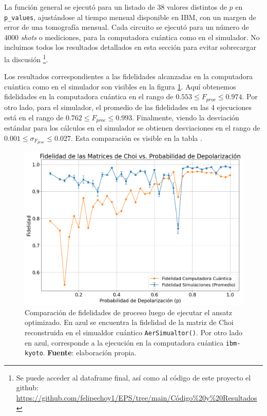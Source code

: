 \documentclass[letterpaper,12pt]{thesisECFM}
\theoremstyle{plain}
\theoremstyle{definition}
\theoremstyle{remark}
\newcommand{\1}{\mathbb{1}}
\begin{document}
La función general se ejecutó para un listado de 38 valores distintos de $p$ en \texttt{p\_values}, ajustándose al tiempo mensual disponible en IBM, con un margen de error de una tomografía mensual. Cada circuito se ejecutó para un número de 4000 \textit{shots} o mediciones, para la computadora cuántica como en el simulador. No incluimos todos los resultados detallados en esta sección para evitar sobrecargar la discusión \footnote{Se puede acceder al dataframe final, así como al código de este proyecto el github: \href{https://github.com/felipechoy1/EPS/tree/main/Código\%20y\%20Resultados}{https://github.com/felipechoy1/EPS/tree/main/Código\%20y\%20Resultados}}.

Los resultados correspondientes a las fidelidades alcanzadas en la computadora cuántica como en el simulador son visibles en la figura \ref{fig:comparacion_fidelidad}. Aquí obtenemos fidelidades en la computadora cuántica en el rango de $0.553\leq F_{proc} \leq 0.974$. Por otro lado, para el simulador, el promedio de las fidelidades en las 4 ejecuciones está en el rango de $0.762\leq F_{proc} \leq 0.993$. Finalmente, viendo la desviación estándar para los cálculos en el simulador se obtienen desviaciones en el rango de $ 0.001\leq \sigma_{F_{proc}} \leq 0.027$. Esta comparación es visible en la tabla \label{tab:comparacion_fidelidades}.

\begin{figure}[h!] 
    \centering 
    \includegraphics[width=0.7\linewidth]{imagenes/comparacion fidelidad.png}
    \caption{Comparación de fidelidades de proceso luego de ejecutar el ansatz optimizado. En azul se encuentra la fidelidad de la matriz de Choi reconstruida en el simualdor cuántico \texttt{AerSimualtor()}. Por otro lado en azul, corresponde a la ejecución en la computadora cuántica \texttt{ibm-kyoto}. \textbf{Fuente}: elaboración propia. }
    \label{fig:comparacion_fidelidad}
    \end{figure}
    
\end{document}
